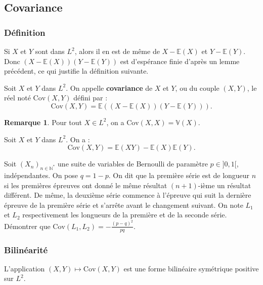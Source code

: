 \documentclass[french]{article}
\newcommand{\N}{\mathbb{N}}
\newcommand{\st}{^*}
\newcommand{\E}{\mathbb{E}}
\newcommand{\V}{\mathbb{V}}
\theoremstyle{plain}
\theoremstyle{definition}
\newtheorem*{rmq}{Remarque}
\theoremstyle{remark}
\begin{document}
\subsection{Covariance}

\subsubsection*{Définition}

Si $X$ et $Y$ sont dans $L^2$, alors il en est de même de $X-\E(X)$ et $Y-\E(Y)$. Donc $(X-\E(X))(Y-\E(Y))$ est d'espérance finie d'après un lemme précédent, ce qui justifie la définition suivante.

\begin{dfn}
	Soit $X$ et $Y$ dans $L^2$. On appelle \textbf{covariance} de $X$ et $Y$, ou du couple $(X,Y)$, le réel noté $\text{Cov}(X,Y)$ défini par : $$\text{Cov}(X,Y)=\E((X-\E(X))(Y-\E(Y))).$$
\end{dfn}

\begin{rmq}
	Pour tout $X\in L^2$, on a $\text{Cov}(X,X)=\V(X)$.
\end{rmq}

\begin{prop}
	Soit $X$ et $Y$ dans $L^2$. On a : $$\text{Cov}(X,Y)=\E(XY)-\E(X)\E(Y).$$
\end{prop}

\begin{exo}
	Soit $(X_n)_{n\in\N\st}$ une suite de variables de Bernoulli de paramètre $p\in]0,1[$, indépendantes. On pose $q=1-p$. On dit que la première série est de longueur $n$ si les premières épreuves ont donné le même résultat $(n+1)$-ième un résultat différent. De même, la deuxième série commence à l'épreuve qui suit la dernière épreuve de la première série et s'arrête avant le changement suivant. On note $L_1$ et $L_2$ respectivement les longueurs de la première et de la seconde série.\\
	Démontrer que $\text{Cov}(L_1,L_2)=\displaystyle -\frac{(p-q)^2}{pq}$.
\end{exo}

\subsubsection*{Bilinéarité}

\begin{prop}%
	L'application $(X,Y)\mapsto\text{Cov}(X,Y)$ est une forme bilinéaire symétrique positive sur $L^2$.
\end{prop}
\end{document}
